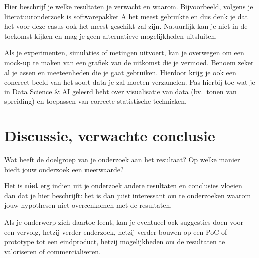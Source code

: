 \documentclass{hogent-article}
\begin{document}

Hier beschrijf je welke resultaten je verwacht en waarom. Bijvoorbeeld, volgens je literatuuronderzoek is softwarepakket A het meest gebruikte en dus denk je dat het voor deze casus ook het meest geschikt zal zijn. Natuurlijk kan je niet in de toekomst kijken en mag je geen alternatieve mogelijkheden uitsluiten.

Als je experimenten, simulaties of metingen uitvoert, kan je overwegen om een mock-up te maken van een grafiek van de uitkomst die je vermoed. Benoem zeker al je assen en meeteenheden die je gaat gebruiken. Hierdoor krijg je ook een concreet beeld van het soort data je zal moeten verzamelen. Pas hierbij toe wat je in Data Science \& AI geleerd hebt over visualisatie van data (bv.\ tonen van spreiding) en toepassen van correcte statistische technieken.

\section{Discussie, verwachte conclusie}%
\label{sec:discussie-conclusie}

Wat heeft de doelgroep van je onderzoek aan het resultaat? Op welke manier biedt jouw onderzoek een meerwaarde?

Het is \textbf{niet} erg indien uit je onderzoek andere resultaten en conclusies vloeien dan dat je hier beschrijft: het is dan juist interessant om te onderzoeken waarom jouw hypothesen niet overeenkomen met de resultaten.

Als je onderwerp zich daartoe leent, kan je eventueel ook suggesties doen voor een vervolg, hetzij verder onderzoek, hetzij verder bouwen op een PoC of prototype tot een eindproduct, hetzij mogelijkheden om de resultaten te valoriseren of commercialiseren.


\printbibliography[heading=bibintoc]
\end{document}

